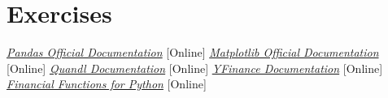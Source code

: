 \section*{Exercises}


\begin{thebibliography}{9}
 \href{https://pandas.pydata.org/docs/}{\emph{Pandas Official Documentation}} [Online]
 \href{https://matplotlib.org}{\emph{Matplotlib Official Documentation}} [Online]
 \href{https://docs.quandl.com/}{\emph{Quandl Documentation}} [Online]
 \href{https://github.com/ranaroussi/yfinance}{\emph{YFinance Documentation}} [Online]
 \href{https://pmorissette.github.io/ffn/}{\emph{Financial Functions for Python}} [Online]
\end{thebibliography}
